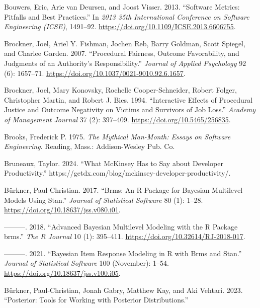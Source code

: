 \documentclass[
]{article}
\newlength{\cslhangindent}
\newenvironment{CSLReferences}[2] %
 {\begin{list}{}{%
  \setlength{\itemindent}{0pt}
  \setlength{\leftmargin}{0pt}
  \setlength{\parsep}{0pt}
  \ifodd #1
   \setlength{\leftmargin}{\cslhangindent}
   \setlength{\itemindent}{-1\cslhangindent}
  \fi
  \setlength{\itemsep}{#2\baselineskip}}}
 {\end{list}}
\begin{document}
\begin{CSLReferences}{1}{0}
Bouwers, Eric, Arie van Deursen, and Joost Visser. 2013. {``Software
Metrics: {Pitfalls} and Best Practices.''} In \emph{2013 35th
{International Conference} on {Software Engineering} ({ICSE})},
1491--92. \url{https://doi.org/10.1109/ICSE.2013.6606755}.

Brockner, Joel, Ariel Y. Fishman, Jochen Reb, Barry Goldman, Scott
Spiegel, and Charlee Garden. 2007. {``Procedural Fairness, Outcome
Favorability, and Judgments of an Authority's Responsibility.''}
\emph{Journal of Applied Psychology} 92 (6): 1657--71.
\url{https://doi.org/10.1037/0021-9010.92.6.1657}.

Brockner, Joel, Mary Konovsky, Rochelle Cooper-Schneider, Robert Folger,
Christopher Martin, and Robert J. Bies. 1994. {``Interactive {Effects}
of {Procedural Justice} and {Outcome Negativity} on {Victims} and
{Survivors} of {Job Loss}.''} \emph{Academy of Management Journal} 37
(2): 397--409. \url{https://doi.org/10.5465/256835}.

Brooks, Frederick P. 1975. \emph{The Mythical Man-Month: Essays on
Software Engineering}. Reading, Mass.: Addison-Wesley Pub. Co.

Bruneaux, Taylor. 2024. {``What {McKinsey} Has to Say about Developer
Productivity.''}
https://getdx.com/blog/mckinsey-developer-productivity/.

Bürkner, Paul-Christian. 2017. {``Brms: {An R Package} for {Bayesian
Multilevel Models Using Stan}.''} \emph{Journal of Statistical Software}
80 (1): 1--28. \url{https://doi.org/10.18637/jss.v080.i01}.

---------. 2018. {``Advanced {Bayesian} Multilevel Modeling with the {R}
Package {brms}.''} \emph{The R Journal} 10 (1): 395--411.
\url{https://doi.org/10.32614/RJ-2018-017}.

---------. 2021. {``Bayesian {Item Response Modeling} in {R} with Brms
and {Stan}.''} \emph{Journal of Statistical Software} 100 (November):
1--54. \url{https://doi.org/10.18637/jss.v100.i05}.

Bürkner, Paul-Christian, Jonah Gabry, Matthew Kay, and Aki Vehtari.
2023. {``Posterior: {Tools} for Working with Posterior Distributions.''}


\end{CSLReferences}
\end{document}

